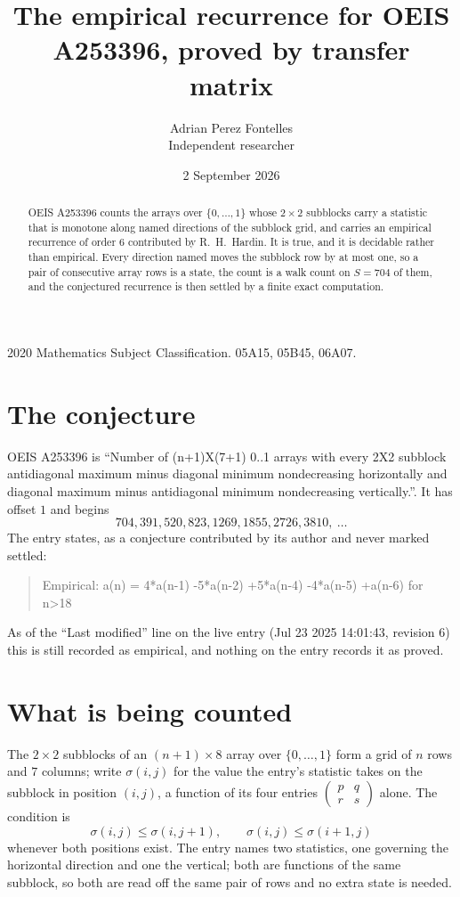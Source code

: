 \documentclass[11pt,a4paper]{article}
\title{The empirical recurrence for OEIS A253396, proved by transfer matrix}
\author{Adrian Perez Fontelles\\ \small Independent researcher}
\date{2 September 2026}
\theoremstyle{plain}
\theoremstyle{definition}
\begin{document}
\maketitle

\begin{abstract}
OEIS A253396 counts the arrays over $\{0,\dots,1\}$ whose $2\times2$ subblocks carry a
statistic that is monotone along named directions of the subblock grid, and carries an
empirical recurrence of order $6$ contributed by R.~H.~Hardin. It is true, and it is
decidable rather than empirical. Every direction named moves the subblock row by at most one,
so a pair of consecutive array rows is a state, the count is a walk count on $S=704$ of them,
and the conjectured recurrence is then settled by a finite exact computation.
\end{abstract}

\noindent\small 2020 Mathematics Subject Classification. 05A15, 05B45, 06A07.\normalsize

\section{The conjecture}

OEIS A253396 is ``Number of (n+1)X(7+1) 0..1 arrays with every 2X2 subblock antidiagonal maximum minus diagonal minimum nondecreasing horizontally and diagonal maximum minus antidiagonal minimum nondecreasing vertically.''. It has offset $1$ and begins
\[
704, 391, 520, 823, 1269, 1855, 2726, 3810,\ \dots
\]
The entry states, as a conjecture contributed by its author and never marked settled:
\begin{quote}
Empirical: a(n) = 4*a(n-1) -5*a(n-2) +5*a(n-4) -4*a(n-5) +a(n-6) for n>18
\end{quote}
As of the ``Last modified'' line on the live entry (Jul 23 2025 14:01:43, revision 6) this is still
recorded as empirical, and nothing on the entry records it as proved.

\section{What is being counted}

The $2\times2$ subblocks of an $(n+1)\times8$ array over $\{0,\dots,1\}$ form a grid
of $n$ rows and $7$ columns; write $\sigma(i,j)$ for the value the entry's statistic takes on
the subblock in position $(i,j)$, a function of its four entries
$\begin{pmatrix}p&q\\r&s\end{pmatrix}$ alone. The condition is
\[
\sigma(i,j)\le\sigma(i,j+1),\qquad \sigma(i,j)\le\sigma(i+1,j)
\]
whenever both positions exist. The entry names two statistics, one governing the horizontal direction and one the vertical; both are functions of the same subblock, so both are read off the same pair of rows and no extra state is needed.
\end{document}

